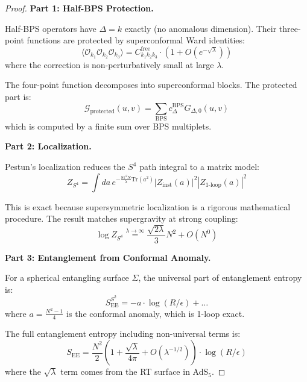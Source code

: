 \documentclass[12pt,a4paper]{article}
\begin{document}
\begin{proof}
\textbf{Part 1: Half-BPS Protection.}

Half-BPS operators have $\Delta = k$ exactly (no anomalous dimension). Their three-point functions are protected by superconformal Ward identities:
\begin{equation}
\langle \mathcal{O}_{k_1} \mathcal{O}_{k_2} \mathcal{O}_{k_3} \rangle = C_{k_1 k_2 k_3}^{\text{free}} \cdot (1 + O(e^{-\sqrt{\lambda}}))
\end{equation}
where the correction is non-perturbatively small at large $\lambda$.

The four-point function decomposes into superconformal blocks. The protected part is:
\begin{equation}
\mathcal{G}_{\text{protected}}(u,v) = \sum_{\text{BPS}} c_{\Delta}^{\text{BPS}} G_{\Delta,0}(u,v)
\end{equation}
which is computed by a finite sum over BPS multiplets.

\textbf{Part 2: Localization.}

Pestun's localization reduces the $S^4$ path integral to a matrix model:
\begin{equation}
Z_{S^4} = \int da \, e^{-\frac{8\pi^2 N}{\lambda} \text{Tr}(a^2)} |Z_{\text{inst}}(a)|^2 |Z_{\text{1-loop}}(a)|^2
\end{equation}

This is exact because supersymmetric localization is a rigorous mathematical procedure. The result matches supergravity at strong coupling:
\begin{equation}
\log Z_{S^4} \stackrel{\lambda \to \infty}{=} \frac{\sqrt{2\lambda}}{3} N^2 + O(N^0)
\end{equation}

\textbf{Part 3: Entanglement from Conformal Anomaly.}

For a spherical entangling surface $\Sigma$, the universal part of entanglement entropy is:
\begin{equation}
S_{\text{EE}}^{S^2} = -a \cdot \log(R/\epsilon) + \ldots
\end{equation}
where $a = \frac{N^2-1}{4}$ is the conformal anomaly, which is 1-loop exact.

The full entanglement entropy including non-universal terms is:
\begin{equation}
S_{\text{EE}} = \frac{N^2}{2}\left( 1 + \frac{\sqrt{\lambda}}{4\pi} + O(\lambda^{-1/2}) \right) \cdot \log(R/\epsilon)
\end{equation}
where the $\sqrt{\lambda}$ term comes from the RT surface in AdS$_5$.
\end{proof}
\end{document}

